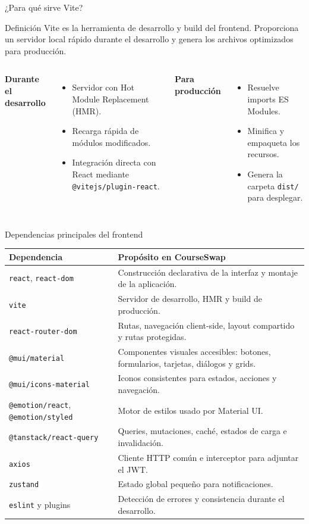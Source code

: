 \documentclass[aspectratio=169,11pt]{beamer}
\begin{document}
\begin{frame}{¿Para qué sirve Vite?}
  \begin{block}{Definición}
    Vite es la herramienta de desarrollo y build del frontend. Proporciona un
    servidor local rápido durante el desarrollo y genera los archivos optimizados
    para producción.
  \end{block}
  \begin{columns}[T]
      \textbf{Durante el desarrollo}
      \begin{itemize}
        \item Servidor con Hot Module Replacement (HMR).
        \item Recarga rápida de módulos modificados.
        \item Integración directa con React mediante \texttt{@vitejs/plugin-react}.
      \end{itemize}
      \textbf{Para producción}
      \begin{itemize}
        \item Resuelve imports ES Modules.
        \item Minifica y empaqueta los recursos.
        \item Genera la carpeta \texttt{dist/} para desplegar.
      \end{itemize}
  \end{columns}
\end{frame}

\begin{frame}{Dependencias principales del frontend}
\scriptsize
\begin{tabular}{>{\raggedright\arraybackslash}p{}
                >{\raggedright\arraybackslash}p{}}
\toprule
\textbf{Dependencia} & \textbf{Propósito en CourseSwap} \\
\midrule
\texttt{react}, \texttt{react-dom} & Construcción declarativa de la interfaz y montaje de la aplicación. \\
\texttt{vite} & Servidor de desarrollo, HMR y build de producción. \\
\texttt{react-router-dom} & Rutas, navegación client-side, layout compartido y rutas protegidas. \\
\texttt{@mui/material} & Componentes visuales accesibles: botones, formularios, tarjetas, diálogos y grids. \\
\texttt{@mui/icons-material} & Iconos consistentes para estados, acciones y navegación. \\
\texttt{@emotion/react}, \texttt{@emotion/styled} & Motor de estilos usado por Material UI. \\
\texttt{@tanstack/react-query} & Queries, mutaciones, caché, estados de carga e invalidación. \\
\texttt{axios} & Cliente HTTP común e interceptor para adjuntar el JWT. \\
\texttt{zustand} & Estado global pequeño para notificaciones. \\
\texttt{eslint} y plugins & Detección de errores y consistencia durante el desarrollo. \\
\bottomrule
\end{tabular}
\end{frame}
\end{document}
